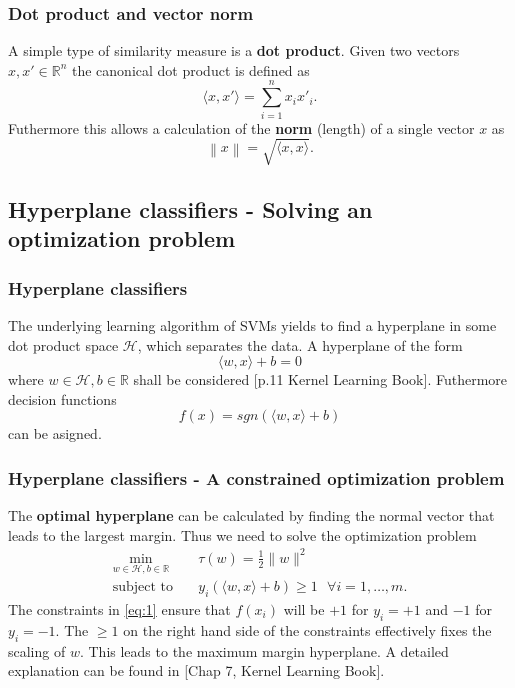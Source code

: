 \documentclass{beamer}
\begin{document}
\begin{frame}{}
    \frametitle{Dot product and vector norm}
    A simple type of similarity measure is a \textbf{dot product}. Given two vectors $x, x' \in \mathbb{R}^n$ the canonical dot product is defined as
    \begin{equation}
        \langle x,x' \rangle = \sum_{i = 1}^{n} x_i x'_i.
    \end{equation}
    Futhermore this allows a calculation of the \textbf{norm} (length) of a single vector $x$ as 
    \begin{equation}
        \left\lVert x \right\rVert = \sqrt{\langle x,x \rangle}.
    \end{equation}
\end{frame}


\subsection{Hyperplane classifiers - Solving an optimization problem}

\begin{frame}{}
    \frametitle{Hyperplane classifiers}
    The underlying learning algorithm of SVMs yields to find a hyperplane in some dot product space $\mathcal{H}$, which separates the data. A hyperplane of the form
    \begin{equation}
        \langle w,x \rangle + b = 0
    \end{equation}
    where $w \in \mathcal{H}, b \in \mathbb{R}$ shall be considered [p.11 Kernel Learning Book]. Futhermore decision functions 
    \begin{equation}
        f(x) = sgn \left( \langle w,x \rangle + b \right)
    \end{equation}
    can be asigned.
\end{frame}


\begin{frame}{}
    \frametitle{Hyperplane classifiers - A constrained optimization problem}
    The \textbf{optimal hyperplane} can be calculated by finding the normal vector that leads to the largest margin. Thus we need to solve the optimization problem
    \begin{equation} \label{eq:1}
        \begin{aligned}
            \min_{w \in \mathcal{H}, b \in \mathbb{R}} \quad & \tau (w) = \frac{1}{2} \lVert w \rVert^2 \\
            \textrm{subject to} \quad & y_{i} \left( \langle w,x \rangle + b \right) \geq 1 \text{ } \forall i = {1, \dots, m}. 
        \end{aligned}
    \end{equation}
    The constraints in \eqref{eq:1} ensure that $f(x_i)$ will be $+1$ for $y_i = +1$ and $-1$ for  $y_i = -1$. The $\geq 1$ on the right hand side of the constraints effectively fixes the scaling of $w$. This leads to the maximum margin hyperplane. A detailed explanation can be found in [Chap 7, Kernel Learning Book].
\end{frame}
\end{document}
